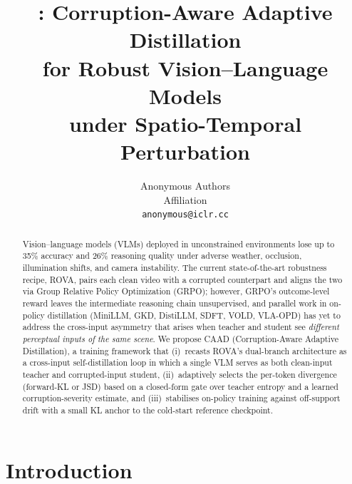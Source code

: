 \documentclass{article}
\title{\caad{}: Corruption-Aware Adaptive Distillation\\
for Robust Vision--Language Models\\
under Spatio-Temporal Perturbation}
\author{Anonymous Authors\\
Affiliation\\
\texttt{anonymous@iclr.cc}}
\newcommand{\caad}{\textsc{CAAD}}
\begin{document}
\maketitle

\begin{abstract}
Vision--language models (VLMs) deployed in unconstrained environments lose up to 35\% accuracy and 26\% reasoning quality under adverse weather, occlusion, illumination shifts, and camera instability. The current state-of-the-art robustness recipe, ROVA, pairs each clean video with a corrupted counterpart and aligns the two via Group Relative Policy Optimization (GRPO); however, GRPO's outcome-level reward leaves the intermediate reasoning chain unsupervised, and parallel work in on-policy distillation (MiniLLM, GKD, DistiLLM, SDFT, VOLD, VLA-OPD) has yet to address the cross-input asymmetry that arises when teacher and student see \emph{different perceptual inputs of the same scene}. We propose \caad{} (Corruption-Aware Adaptive Distillation), a training framework that (i)~recasts ROVA's dual-branch architecture as a cross-input self-distillation loop in which a single VLM serves as both clean-input teacher and corrupted-input student, (ii)~adaptively selects the per-token divergence (forward-KL or JSD) based on a closed-form gate over teacher entropy and a learned corruption-severity estimate, and (iii)~stabilises on-policy training against off-support drift with a small KL anchor to the cold-start reference checkpoint. 


\end{abstract}

\section{Introduction}
\end{document}
